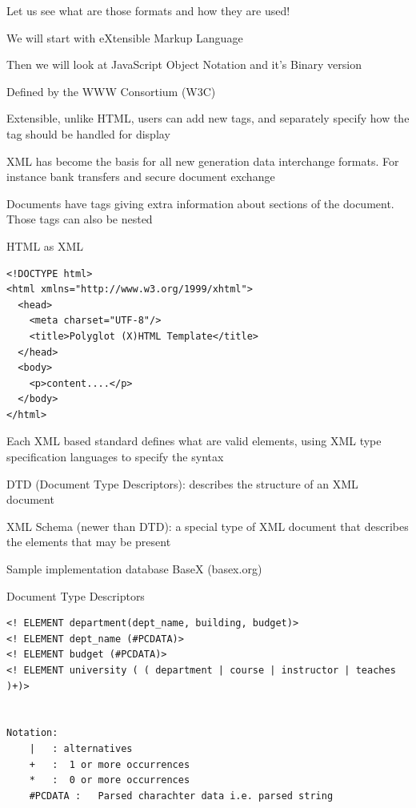 \documentclass{beamer}
\begin{document}
\begin{slide}{
\item Let us see what are those formats and how they are used!
\item We will start with eXtensible Markup Language 
\item Then we will look at JavaScript Object Notation and it's Binary version 
}\end{slide}

\begin{slide}{
\item Defined by the WWW Consortium (W3C)
\item Extensible, unlike HTML, users can add new tags, and separately specify how the tag should be handled for display	 
\item XML has become the basis for all new generation data interchange formats. For instance bank transfers and secure document exchange
\item Documents have tags giving extra information about sections of the document. Those tags can also be nested
}\end{slide}

\begin{frame}[fragile]{HTML as XML }
\begin{lstlisting}
<!DOCTYPE html>
<html xmlns="http://www.w3.org/1999/xhtml">
  <head>
    <meta charset="UTF-8"/>
    <title>Polyglot (X)HTML Template</title>
  </head>
  <body>
    <p>content....</p>
  </body>
</html>
\end{lstlisting}
\end{frame}

\begin{slide}{
\item Each XML based standard defines what are valid elements, using XML type specification languages to specify the syntax
\item DTD (Document Type Descriptors): describes the structure of an XML document
\item XML Schema (newer than DTD): a special type of XML document that describes the elements that may be present
\item Sample implementation database BaseX (basex.org)
}\end{slide}

\begin{frame}[fragile]{Document Type Descriptors}
\begin{lstlisting}
<! ELEMENT department(dept_name, building, budget)>
<! ELEMENT dept_name (#PCDATA)>
<! ELEMENT budget (#PCDATA)>
<! ELEMENT university ( ( department | course | instructor | teaches )+)>


Notation:
	|	: alternatives
	+	:  1 or more occurrences
	* 	:  0 or more occurrences
	#PCDATA	:	Parsed charachter data i.e. parsed string
\end{lstlisting}
\end{frame}
\end{document}
